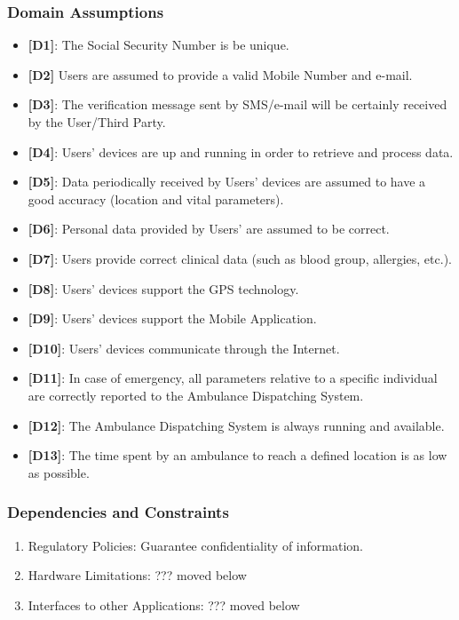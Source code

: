 \documentclass[12pt,a4paper]{article}
\begin{document}
		\subsubsection{Domain Assumptions}
			\begin{itemize}
				\item {\textbf[}\textbf{D1}{\textbf]}: The Social Security Number is be unique.
				\item {\textbf[}\textbf{D2}{\textbf]} Users are assumed to provide a valid Mobile Number and e-mail.
				\item {\textbf[}\textbf{D3}{\textbf]}: The verification message sent by SMS/e-mail will be certainly received by the User/Third Party.
				\item {\textbf[}\textbf{D4}{\textbf]}: Users' devices are up and running in order to retrieve and process data.
				\item {\textbf[}\textbf{D5}{\textbf]}: Data periodically received by Users' devices are assumed to have a good accuracy (location and vital parameters).
				\item {\textbf[}\textbf{D6}{\textbf]}: Personal data provided by Users' are assumed to be correct.
				\item {\textbf[}\textbf{D7}{\textbf]}: Users provide correct clinical data (such as blood group, allergies, etc.).
				\item {\textbf[}\textbf{D8}{\textbf]}: Users' devices support the GPS technology.
				\item {\textbf[}\textbf{D9}{\textbf]}: Users' devices support the Mobile Application.
				\item {\textbf[}\textbf{D10}{\textbf]}: Users' devices communicate through the Internet.
				\item {\textbf[}\textbf{D11}{\textbf]}: In case of emergency, all parameters relative to a specific individual are correctly reported to the Ambulance Dispatching System.
				\item {\textbf[}\textbf{D12}{\textbf]}: The Ambulance Dispatching System is always running and available.
				\item {\textbf[}\textbf{D13}{\textbf]}: The time spent by an ambulance to reach a defined location is as low as possible.
			\end{itemize}
		\subsubsection{Dependencies and Constraints}
			\begin{enumerate}
				\item Regulatory Policies:
				Guarantee confidentiality of information.
				\item Hardware Limitations:  				 ??? moved below
				\item Interfaces to other Applications:  ??? moved below
			\end{enumerate}
\end{document}

